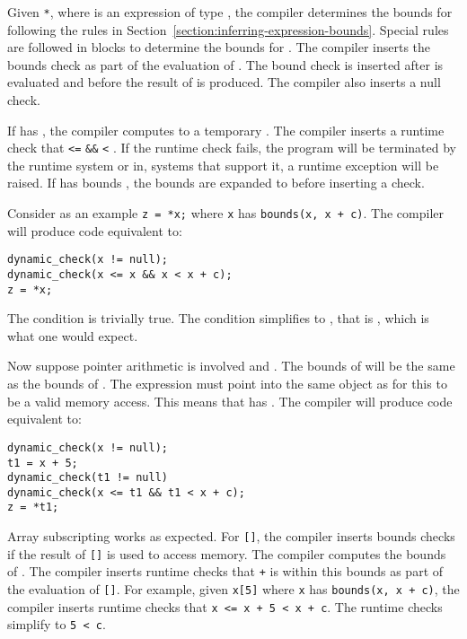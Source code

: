 Given \lstinline|*|, where  is an expression of type
\arrayptr, the compiler determines the bounds for 
following the rules in Section~\ref{section:inferring-expression-bounds}.
Special rules are followed in
 blocks to determine the bounds for . The
compiler inserts the bounds check as part of the evaluation of .
The bound check is inserted after  is evaluated and before the result of
 is produced.  The compiler also inserts a null check.

If {} has {}, the compiler
computes  to a temporary .   The compiler inserts a runtime check that
 \lstinline|<=|  \lstinline|&&|
 \lstinline|<| . If the runtime check fails, the program
will be terminated by the runtime system or in, systems that support it,
a runtime exception will be raised.   If {} has bounds {},
the bounds are expanded to  before inserting a check.

Consider as an example \lstinline|z = *x;| where
\lstinline|x| has \lstinline|bounds(x, x + c)|. The compiler will produce code equivalent to:
\begin{lstlisting}
dynamic_check(x != null);
dynamic_check(x <= x && x < x + c);
z = *x;
\end{lstlisting}
The condition  is trivially true. The
condition  simplifies to , that is , which is what one
would expect.

Now suppose pointer arithmetic is involved and . The
bounds of  will be the same as the bounds of .
The expression  must point into the same object as
 for this to be a valid memory access. This means that
{} has {}.
The compiler will produce code equivalent to:

\begin{lstlisting}
dynamic_check(x != null);
t1 = x + 5;
dynamic_check(t1 != null)
dynamic_check(x <= t1 && t1 < x + c);
z = *t1;
\end{lstlisting}

Array subscripting works as expected. For \lstinline|[|\lstinline|]|, the
compiler inserts bounds checks if the result of \lstinline|[|\lstinline|]|
is used to access memory.   The compiler computes the bounds of
. The compiler inserts
runtime checks that  \lstinline|+|  is within this bounds as
part of the evaluation of \lstinline|[|\lstinline|]|. For example,
given \lstinline|x[5]| where \lstinline|x| has \lstinline|bounds(x, x + c)|, the
compiler inserts runtime checks that \lstinline|x <= x + 5 < x + c|. 
The runtime checks simplify to \lstinline|5 < c|.

